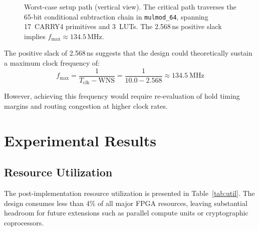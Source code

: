 \documentclass[lettersize,journal]{IEEEtran}
\begin{document}
\begin{figure}[!t]
\caption{Worst-case setup path (vertical view). The critical path traverses the 65-bit conditional subtraction chain in \texttt{mulmod\_64}, spanning 17~CARRY4 primitives and 3~LUTs. The 2.568\,ns positive slack implies $f_{\max} \approx 134.5$\,MHz.}
\label{fig:critpath}
\end{figure}

The positive slack of 2.568\,ns suggests that the design could theoretically sustain a maximum clock frequency of:
\begin{equation}
f_{\max} = \frac{1}{T_{\text{clk}} - \text{WNS}} = \frac{1}{10.0 - 2.568} \approx 134.5~\text{MHz}
\label{eq:fmax}
\end{equation}

\noindent However, achieving this frequency would require re-evaluation of hold timing margins and routing congestion at higher clock rates.

\section{Experimental Results}
\label{sec:results}

\subsection{Resource Utilization}

The post-implementation resource utilization is presented in Table~\ref{tab:util}. The design consumes less than 4\% of all major FPGA resources, leaving substantial headroom for future extensions such as parallel compute units or cryptographic coprocessors.
\end{document}
